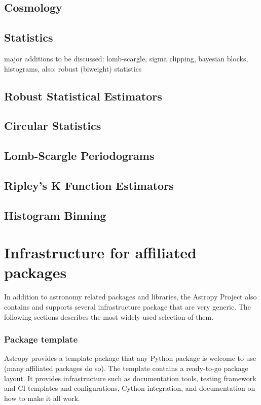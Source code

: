 \documentclass[modern]{aastex61}
\begin{document}

\subsection{Cosmology}


\subsection{Statistics}
major additions to be discussed: lomb-scargle, sigma clipping, bayesian blocks, histograms, also:  robust (biweight) statistics

\subsection{Robust Statistical Estimators}
\subsection{Circular Statistics}
\subsection{Lomb-Scargle Periodograms}
\subsection{Ripley's K Function Estimators}
\subsection{Histogram Binning}

\section{Infrastructure for affiliated packages}
\label{sec:infrastructure}
%
\par In addition to astronomy related packages and libraries, the Astropy
Project also contains and supports several infrastructure package that are
very generic. The following sections describes the most widely used
selection of them.
%
\subsubsection{Package template}
\par Astropy provides a template package that any Python package is welcome to
use (many affiliated packages do so). The template contains a ready-to-go
package layout. It provides infrastructure such as documentation tools,
testing framework and CI templates and configurations, Cython integration,
and documentation on how to make it all work.
%
\end{document}
